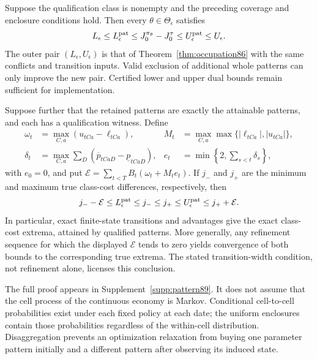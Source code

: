 \begin{theorem}\label{thm:pattern89}
Suppose the qualification class is nonempty and the preceding coverage and enclosure conditions hold. Then every $\theta\in\Theta_\epsilon$ satisfies
\[
 L_\epsilon\le L_\epsilon^{\rm pat}
 \le J_0^{\pi_\theta}-J_0^\tau
 \le U_\epsilon^{\rm pat}\le U_\epsilon.
\]
The outer pair $(L_\epsilon,U_\epsilon)$ is that of Theorem~\ref{thm:occupation86} with the same conflicts and transition inputs. Valid exclusion of additional whole patterns can only improve the new pair. Certified lower and upper dual bounds remain sufficient for implementation.

Suppose further that the retained patterns are exactly the attainable patterns, and each has a qualification witness. Define
\begin{align*}
 \omega_t&=\max_{C,a}(u_{tCa}-\ell_{tCa}),&
 M_t&=\max_{C,a}\max\{|\ell_{tCa}|,|u_{tCa}|\},\\
 \delta_t&=\max_{C,a}\sum_D
       (\overline p_{tCaD}-\underline p_{tCaD}),&
 e_t&=\min\left\{2,\sum_{s<t}\delta_s\right\},
\end{align*}
with $e_0=0$, and put $\mathcal E=\sum_{t<T}B_t(\omega_t+M_te_t)$. If $j_-$ and $j_+$ are the minimum and maximum true class-cost differences, respectively, then
\begin{equation}\label{eq:pattern-error89}
 j_- -\mathcal E\le L_\epsilon^{\rm pat}\le j_-\le j_+
 \le U_\epsilon^{\rm pat}\le j_++\mathcal E.
\end{equation}
In particular, exact finite-state transitions and advantages give the exact class-cost extrema, attained by qualified patterns. More generally, any refinement sequence for which the displayed $\mathcal E$ tends to zero yields convergence of both bounds to the corresponding true extrema. The stated transition-width condition, not refinement alone, licenses this conclusion.
\end{theorem}

The full proof appears in Supplement~\ref{supp:pattern89}. It does not assume that the cell process of the continuous economy is Markov. Conditional cell-to-cell probabilities exist under each fixed policy at each date; the uniform enclosures contain those probabilities regardless of the within-cell distribution. Disaggregation prevents an optimization relaxation from buying one parameter pattern initially and a different pattern after observing its induced state.


